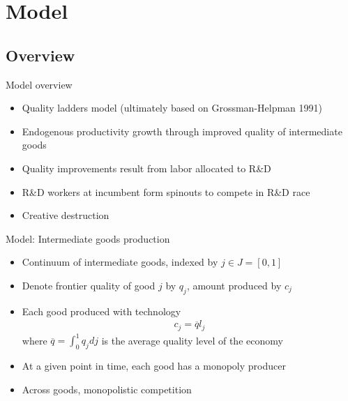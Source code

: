 \documentclass[english,usenames,dvipsnames]{beamer}
\begin{document}
\section{Model}
\subsection{Overview}

\begin{frame}{Model overview}
\begin{itemize}
	\item Quality ladders model (ultimately based on Grossman-Helpman 1991)
	\item Endogenous productivity growth through improved quality of intermediate goods
	\item Quality improvements result from labor allocated to R\&D 
	\item R\&D workers at incumbent form spinouts to compete in R\&D race
	\item Creative destruction
\end{itemize}
\end{frame}



\begin{frame}{Model: Intermediate goods production}
\begin{itemize}
	\item Continuum of intermediate goods, indexed by $j\in J = [0,1]$
	\item Denote frontier quality of good $j$ by $q_j$, amount produced by $c_j$
	\item Each good produced with technology
	\begin{align*}
	c_j = \overline{q} l_j
	\end{align*}
	where $\overline{q} = \int_0^1 q_j dj$ is the average quality level of the economy
	\item At a given point in time, each good has a monopoly producer
	\item Across goods, monopolistic competition
\end{itemize}
\end{frame}
\end{document}
